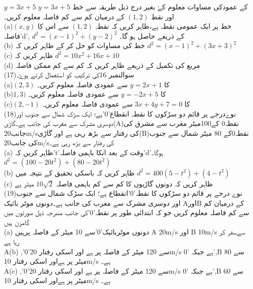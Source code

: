 \newpage

\(y=3x+5\)
کے عمودکی مساوات معلوم کۓ بغیر درج ذیل طریقہ سے خط 
\(y=3x+5\)
اور نقط 
\((1,2)\)
کے درمیان کم سے کم فاصلہ معلوم کریں۔\\
(a)\((x,y)\)
خط پر ایک عمومی نقطہ ہے،ظاہر کریں کہ نقطہ 
\((1,2)\)
سے اس کا فاصلہ'd',
\(d^{2}=(x-1)^{2}+(y-2)^{2}\)
کے ذريعے حاصل ہو گا۔\\
(b)
خط کی مساوات کو حل کر کے ظاہر کریں کہ
\(d^{2}=(x-1)^{2}+(3x+3)^{2}\)\\
(c)
ظاہر کریں کہ
\(d^{2}=10x^{2}+16x+10\)\\
(d)
مربع کی تکمیل کے ذريعے ظاہر کریں کہ کم سے کم ممکن فاصلہ\\
(17)سوالنمبر 16کی ترکيب کو استعمال کرتے ہوۓ۔\\
(a)\((2,3)\)
کا 
\(y=2x+1\)
سے عمودی فاصلہ معلوم کريں۔\\
(b)\(1,3)\)
کا 
\(y=-2x+5\)
سے عمودی فاصلہ معلوم کريں۔\\
(c)\((2,-1)\)
کا 
\(3x+4y+7=0\)
سے عمودی فاصلہ معلوم کريں۔\\
(18)نوےدرجے پر قائم دو سڑکوں کا نقطہ انقطاع'0'ہے؛ ایک سڑک شمال سے جنوب اور دوسری مشرک سے مغرب کی جانب ہے۔گاڑی(A)نقطہ0 کے100میٹر مغرب سے مشرق کی جانب20m/sکی رفتار سے بڑھ رہی ہے اور گاڑی(B)نقطہ0کے 80 میٹر شمال سے جنوب کی جانب20m/sکی رفتار سے بڑھ رہی ہے۔\\
(a)
ظاہر کریں کہ't'وقت کے بعد انکا باہمی فاصلہ'd'ہوگا۔\\
\(d^{2}=(100-20t^{2})+(80-20t^{2})\)\\
(b)
ظاہر کریں کہ باسکی تحقیق کے نتیجہ میں
\(d^{2}=400(5-t^{2})+(4-t^{2})\)\\
(c)
ظاہر کریں کہ دونوں گاڑیوں کا کم سے کم باہمی فاصلہ 
\(10\sqrt{2}\)
میٹر ہے\\
(19)نوے درجے پر قائم دو سڑکوں کا نقطہ'0'انقطاع ہے؛ ایک سڑک شمال سے جنوب اور دوسری مشرک سے مغرب کی جانب ہے۔دونوں موٹر بائيک AاورB کے درمیان کم سے کم فاصلہ معلوم کریں جو کہ ابتدائی طور پر نقطہ'0'کی جانب مندرجہ ذیل صورتوں میں گامزن ہیں\\
(a)
دونوں موٹربائیک'0'سے 10 میٹر کے فاصلہ پرہیں 
A 20m/s
اور
B 10m/s
سےسفر کر رہا ہے\\
A(b)
,'0'سے 120 میٹر کے فاصلہ پر ہے اور اسکی رفتار 20m/s ہے جبکہ '0',B سے 80 میٹر پر ہےاور اسکی رفتار 10m/s ہے۔\\
A(c)
,'0'سے 120 میٹر کے فاصلہ پر ہے اور اسکی رفتار 20m/s ہے جبکہ '0',B سے 60 میٹر پر ہےاور اسکی رفتار 10m/s ہے۔\\

